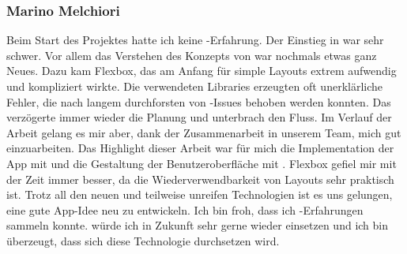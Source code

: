 \subsubsection{Marino Melchiori}
Beim Start des Projektes hatte ich keine -Erfahrung. 
Der Einstieg in  war sehr schwer. 
Vor allem das Verstehen des Konzepts von  war nochmals etwas ganz Neues. 
Dazu kam Flexbox, das am Anfang für simple Layouts extrem aufwendig und kompliziert wirkte. \newline
Die verwendeten Libraries erzeugten oft unerklärliche Fehler, die nach langem durchforsten von -Issues behoben werden konnten. 
Das verzögerte immer wieder die Planung und unterbrach den Fluss. \newline
Im Verlauf der Arbeit gelang es mir aber, dank der Zusammenarbeit in unserem Team, mich gut  einzuarbeiten.
Das Highlight dieser Arbeit war für mich die Implementation der App mit  und die Gestaltung der Benutzeroberfläche mit . 
Flexbox gefiel mir mit der Zeit immer besser, da die Wiederverwendbarkeit von Layouts sehr praktisch ist. \newline
Trotz all den neuen und teilweise unreifen Technologien ist es uns gelungen, eine gute App-Idee neu zu entwickeln. 
Ich bin froh, dass ich -Erfahrungen sammeln konnte. 
 würde ich in Zukunft sehr gerne wieder einsetzen und ich bin überzeugt, dass sich diese Technologie durchsetzen wird. 
